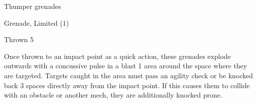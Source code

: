 Thumper grenades

Grenade, Limited (1)

Thrown 5

Once thrown to an impact point as a quick action, these grenades explode outwards with a
concussive pulse in a blast 1 area around the space where they are targeted. Targets caught in
the area must pass an agility check or be knocked back 3 spaces directly away from the impact
point. If this causes them to collide with an obstacle or another mech, they are additionally
knocked prone.
